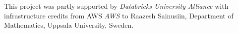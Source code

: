 \documentclass[main.tex]{subfiles}
\begin{document}
  This project was partly supported by \textit{Databricks University Alliance} with infrastructure credits from AWS \textit{AWS} to Raazesh Sainusiin, Department of Mathematics, Uppsala University, Sweden.
\end{document}
